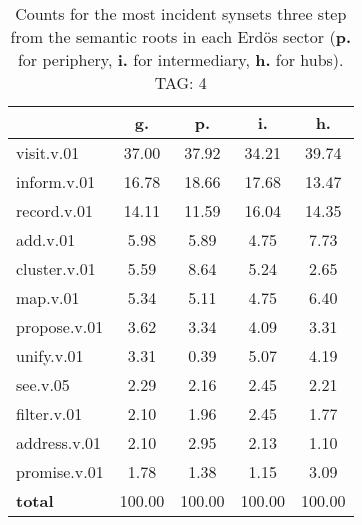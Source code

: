 \begin{table}[h!]
\begin{center}
\begin{tabular}{| l | c | c | c | c |}\hline
 & g. & p. & i. & h. \\\hline
visit.v.01 & 37.00  & 37.92  & 34.21  & 39.74 \\\hline
inform.v.01 & 16.78  & 18.66  & 17.68  & 13.47 \\\hline
record.v.01 & 14.11  & 11.59  & 16.04  & 14.35 \\\hline
add.v.01 & 5.98  & 5.89  & 4.75  & 7.73 \\\hline
cluster.v.01 & 5.59  & 8.64  & 5.24  & 2.65 \\\hline
map.v.01 & 5.34  & 5.11  & 4.75  & 6.40 \\\hline
propose.v.01 & 3.62  & 3.34  & 4.09  & 3.31 \\\hline
unify.v.01 & 3.31  & 0.39  & 5.07  & 4.19 \\\hline
see.v.05 & 2.29  & 2.16  & 2.45  & 2.21 \\\hline
filter.v.01 & 2.10  & 1.96  & 2.45  & 1.77 \\\hline
address.v.01 & 2.10  & 2.95  & 2.13  & 1.10 \\\hline
promise.v.01 & 1.78  & 1.38  & 1.15  & 3.09 \\\hline
{{\bf total}} & 100.00  & 100.00  & 100.00  & 100.00 \\\hline
\end{tabular}
\caption{Counts for the most incident synsets three step from the semantic roots in each Erd\"os sector ({\bf p.} for periphery, {\bf i.} for intermediary, {\bf h.} for hubs). TAG: 4}
\end{center}
\end{table}